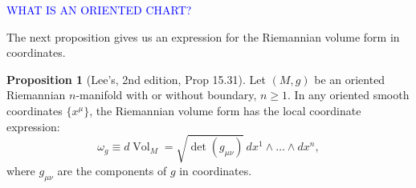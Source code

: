 \documentclass{article}
\theoremstyle{definition}
\renewcommand\det{\operatorname{det}}
\theoremstyle{theorem}
\newtheorem{proposition}[theorem]{Proposition}
\newcommand{\Vol}{\operatorname{Vol}}
\begin{document}

\textcolor{blue}{WHAT IS AN ORIENTED CHART?}

The next proposition gives us an expression for the Riemannian volume form in coordinates. 
\begin{proposition}[Lee's, 2nd edition, Prop 15.31]\label{prop:Lee15.31}
Let $(M,g)$ be an oriented Riemannian $n$-manifold with or without boundary, $n \geq 1$. In any oriented smooth coordinates $\{ x^\mu \}$, the Riemannian volume form has the local coordinate expression:
\begin{equation*}
    \omega_g \equiv d\Vol_M = \sqrt{\det(g_{\mu\nu})}\,  dx^1 \land \dots \land dx^n,
\end{equation*}
where $g_{\mu\nu}$ are the components of $g$ in coordinates. 
\end{proposition}
\end{document}
